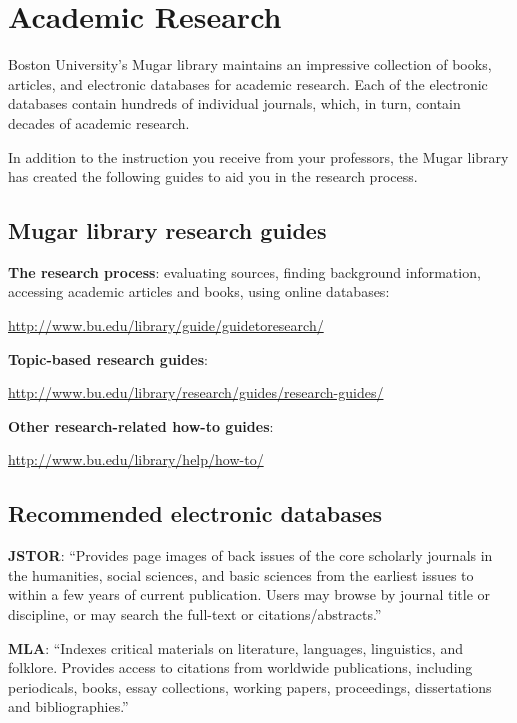 
\chapter{Academic Research}

Boston University's Mugar library maintains an impressive collection of books, articles, and electronic databases for academic research. Each of the electronic databases contain hundreds of individual journals, which, in turn, contain decades of academic research.

In addition to the instruction you receive from your professors, the Mugar library has created the following guides to aid you in the research process.

\section{Mugar library research guides}

\textbf{The research process}: evaluating sources, finding background information, accessing academic articles and books, using online databases: 

\url {http://www.bu.edu/library/guide/guidetoresearch/}

\textbf{Topic-based research guides}:

\url{http://www.bu.edu/library/research/guides/research-guides/}

\textbf{Other research-related how-to guides}:

\url{http://www.bu.edu/library/help/how-to/}

\section{Recommended electronic databases}


\textbf{JSTOR}: ``Provides page images of back issues of the core scholarly journals in the humanities, social sciences, and basic sciences from the earliest issues to within a few years of current publication. Users may browse by journal title or discipline, or may search the full-text or citations/abstracts.''

\textbf{MLA}: ``Indexes critical materials on literature, languages, linguistics, and folklore. Provides access to citations from worldwide publications, including periodicals, books, essay collections, working papers, proceedings, dissertations and bibliographies.''

